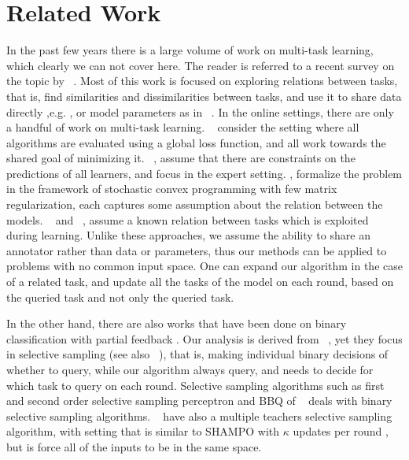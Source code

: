 \chapter{Related Work}

In the past few years there is a large volume of work on multi-task learning, which clearly we can not 
cover here. The reader is referred to a recent survey on the topic by ~\cite{10.1109/TKDE.2009.191}. 
Most of this work is focused on exploring relations between tasks, that is, 
find similarities and dissimilarities  between tasks, and use it to share data directly ,e.g. 
\cite{NIPS2012_0706}, or model parameters as in ~\cite{Evgeniou:2004:RML:1014052.1014067,Daume:2010:FES:1870526.1870534,DBLP:journals/ml/ArgyriouEP08}. 
In the online settings, there are only a handful of work on multi-task learning. 
~\cite{DBLP:conf/colt/DekelLS06} consider the setting where all algorithms are evaluated using a 
global loss function, and all work towards the shared goal of minimizing it. 
~\cite{DBLP:conf/colt/LugosiPS09}, assume that there are constraints on the predictions of all 
learners, and focus in the expert setting. \cite{Agarwal:EECS-2008-138}, formalize the 
problem in the framework of stochastic convex programming with few matrix regularization, each 
captures some assumption about the relation between the models. 
~\cite{DBLP:journals/jmlr/CavallantiCG10} and ~\cite{cesa2006incremental}, 
assume a known relation between tasks which is exploited during learning. 
Unlike these approaches, we assume the ability to share an annotator rather than data or parameters, 
thus our methods can be applied to problems with no common input space. One can 
expand our algorithm in the case of a related task, and update all the tasks of the model  on each round, 
based on the queried task and not only the queried task.

In the other hand, there are also works that have been done on binary classification with partial feedback . 
Our analysis is derived from ~\cite{cesa2006worst}, yet they focus in selective 
sampling (see also ~\cite{cesa2009robust,dekel2010robust,crammer2014doubly}), that is, making individual 
binary decisions of whether to query, while our algorithm always query, and needs to decide for which task 
to query on each round.
Selective sampling algorithms such as first and second order selective sampling perceptron and   
BBQ  of ~\cite{cesa2006worst,cesa2009robust} deals with binary selective 
sampling algorithms. ~\cite{dekel2010robust} have also a multiple teachers selective sampling 
algorithm, with setting that is similar to SHAMPO with $\kappa$ updates per round , but is force all of the 
inputs to be in the same space.

